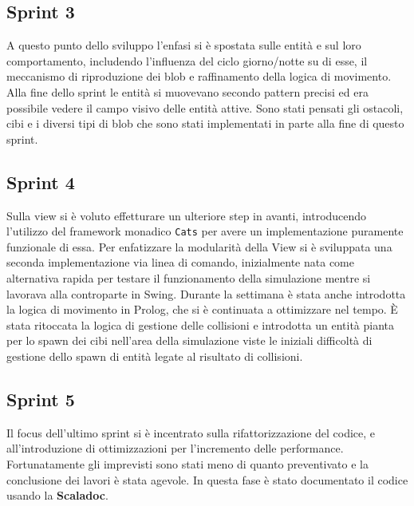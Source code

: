 \subsection{Sprint 3}
A questo punto dello sviluppo l'enfasi si è spostata sulle entità e sul loro comportamento, includendo l'influenza del ciclo giorno/notte su di esse, il meccanismo di riproduzione dei blob e raffinamento della logica di movimento. Alla fine dello sprint le entità si muovevano secondo pattern precisi ed era possibile vedere il campo visivo delle entità attive. Sono stati pensati gli ostacoli, cibi e i diversi tipi di blob che sono stati implementati in parte alla fine di questo sprint.

\subsection{Sprint 4}
Sulla view si è voluto effetturare un ulteriore step in avanti, introducendo l'utilizzo del framework monadico \texttt{Cats} per avere un implementazione puramente funzionale di essa. Per enfatizzare la modularità della View si è sviluppata una seconda implementazione via linea di comando, inizialmente nata come alternativa rapida per testare il funzionamento della simulazione mentre si lavorava alla controparte in Swing. Durante la settimana è stata anche introdotta la logica di movimento in Prolog, che si è continuata a ottimizzare nel tempo. È stata ritoccata la logica di gestione delle collisioni e introdotta un entità pianta per lo spawn dei cibi nell'area della simulazione viste le iniziali difficoltà di gestione dello spawn di entità legate al risultato di collisioni.

\subsection{Sprint 5}
Il focus dell'ultimo sprint si è incentrato sulla rifattorizzazione del codice, e all'introduzione di ottimizzazioni per l'incremento delle performance. Fortunatamente gli imprevisti sono stati meno di quanto preventivato e la conclusione dei lavori è stata agevole. In questa fase è stato documentato il codice usando la \textbf{Scaladoc}.